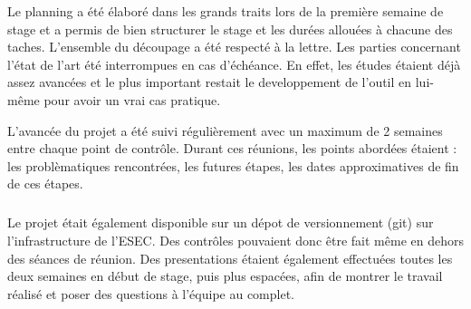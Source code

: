 Le planning a été élaboré dans les grands traits lors de la première semaine de stage et a permis de bien structurer
le stage et les durées allouées à chacune des taches. L'ensemble du découpage a été respecté à la lettre. Les parties
concernant l'état de l'art été interrompues en cas d'échéance. En effet, les études étaient déjà assez avancées et le plus
important restait le developpement de l'outil en lui-même pour avoir un vrai cas pratique.

L'avancée du projet a été suivi régulièrement avec un maximum de 2 semaines entre chaque point de contrôle. Durant ces réunions,
les points abordées étaient : les problèmatiques rencontrées, les futures étapes, les dates approximatives de fin de ces étapes.

\subparagraph{}
Le projet était également disponible sur un dépot de versionnement (git) sur l'infrastructure de l'ESEC. Des contrôles pouvaient donc être
fait même en dehors des séances de réunion. Des presentations étaient également effectuées toutes les deux semaines en début de stage, puis plus
espacées, afin de montrer le travail réalisé et poser des questions à l'équipe au complet.
